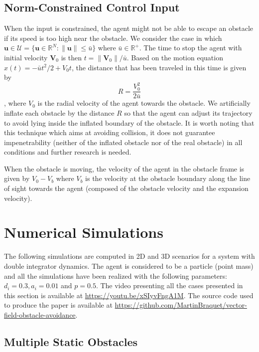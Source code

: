 \subsection{Norm-Constrained Control Input}

When the input is constrained, the agent might not be able to escape an obstacle if its speed is too high near the obstacle. We consider the case in which $\bm{u} \in \mathcal{U} = \{\bm{u} \in \mathbb{R}^N : \|\bm{u}\| \le \bar{u} \}$ where $\bar{u}\in \mathbb{R}^+$. The time to stop the agent with initial velocity $\bm{V}_0$ is then $t = \|\bm{V}_0\| / \bar{u}$. Based on the motion equation $x(t) = - \bar{u}t^2/2 + V_0t$, the distance that has been traveled in this time is given by $$R = \frac{V_0^2}{2\bar{u}}$$, where $V_0$ is the radial velocity of the agent towards the obstacle.
We artificially inflate each obstacle by the distance $R$ so that the agent can adjust its trajectory to avoid lying inside the inflated boundary of the obstacle. It is worth noting that this technique which aims at avoiding collision, it does not guarantee impenetrability (neither of the inflated obstacle nor of the real obstacle) in all conditions and further research is needed. 

When the obstacle is moving, the velocity of the agent in the obstacle frame is given by $V_0 - V_b$ where $V_b$ is the velocity at the obstacle boundary along the line of sight towards the agent (composed of the obstacle velocity and the expansion velocity).


\section{Numerical Simulations} \label{sec:simu}

The following simulations are computed in 2D and 3D scenarios for a system with double integrator dynamics. The agent is considered to be a particle (point mass) and all the simulations have been realized with the following parameters: $d_i = 0.3, a_i = 0.01$ and $p=0.5$. The video presenting all the cases presented in this section is available at \url{https://youtu.be/xSIyvFngA1M}. The source code used to produce the paper is available at \url{https://github.com/MartinBraquet/vector-field-obstacle-avoidance}.

\subsection{Multiple Static Obstacles}

